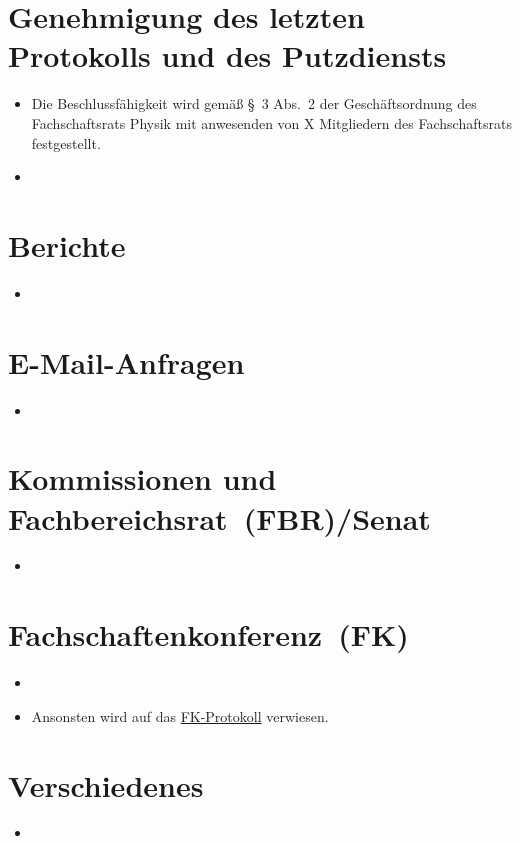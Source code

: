 \documentclass[sitzung=fsr]{fsphys-protokoll}
\begin{document}
\section{Genehmigung des letzten Protokolls und des Putzdiensts}
\begin{itemize}
	\item Die Beschlussfähigkeit wird gemäß §~3 Abs.~2 der Geschäftsordnung des Fachschaftsrats Physik mit {\protokollanzahlanwesend} anwesenden von X Mitgliedern des Fachschaftsrats festgestellt.
	\item 
\end{itemize}

\section{Berichte}
\begin{itemize}
	\item 
\end{itemize}

\section{E-Mail-Anfragen}
\begin{itemize}
	\item 
\end{itemize}

\section{Kommissionen und Fachbereichsrat~(FBR)/Senat}
\begin{itemize}
	\item 
\end{itemize}

\section{Fachschaftenkonferenz~(FK)}
\begin{itemize}
	\item 
	\item Ansonsten wird auf das \href{https://www.asta.ms/hochschulpolitik/hochschulpolitik/fachschaften/fk-protokolle}{FK-Protokoll} verwiesen.
\end{itemize}

\section{Verschiedenes}
\begin{itemize}
	\item 
\end{itemize}
\end{document}
